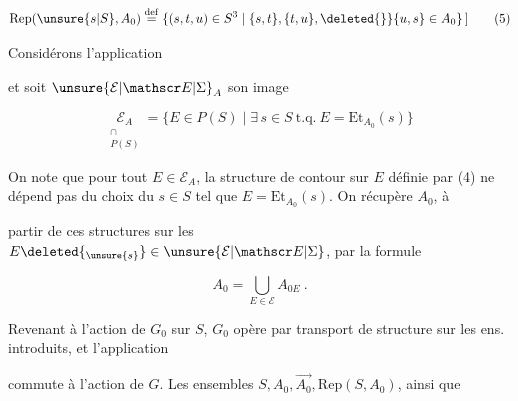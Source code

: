 \[
 \mathrm{Rep}(\unsure{s|S},A_0)\overset{\mathrm{def}}{=}
 \{(s,t,u)\in S^3\mid \{s,t\},\{t,u\},\deleted{\}}\{u,s\}\in A_0\}\,] \tag*{(5)}
\]

 Considérons l'application


et soit $\unsure{\mathcal E|\mathscr E|\Sigma}_A$ son image

\[
 \underset{\substack{\cap\\P(S)}}{\mathcal E_A}=\{E\in P(S)\mid\exists\,s\in S\ \text{t.q.}\ E=\mathrm{Et}_{A_0}(s)\} \tag*{(7)}
\]

On note que pour tout $E\in\mathcal E_A$, la structure de contour
sur $E$ définie par (4) ne dépend pas du choix du $s\in S$ tel que $E=\mathrm{Et}_{A_0}(s)$. On récupère $A_0$, à


partir de ces structures sur les $E\deleted{_{\unsure{s}}}\in\unsure{\mathcal E|\mathscr E|\Sigma}$, par la formule

\[
 A_0=\bigcup_{E\in\mathcal E}A_{0E}\ . \tag*{(8)}
\]

Revenant à l'action de $G_0$ sur $S$, $G_0$ opère
par transport de structure sur les  ens. introduits, et l'application  


commute à l'action de $G$. Les ensembles
$S,A_0,\overrightarrow{A_0},\mathrm{Rep}(S,A_0)$, ainsi que

